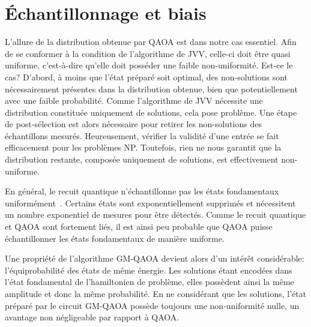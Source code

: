 
\section{Échantillonnage et biais}
\label{sec:echantillonnage-et-biais}

L'allure de la distribution obtenue par QAOA est dans notre cas essentiel. Afin de se conformer à la condition de l'algorithme de JVV, celle-ci doit être quasi uniforme, c'est-à-dire qu'elle doit posséder une faible non-uniformité. Est-ce le cas? D'abord, à moins que l'état préparé soit optimal, des non-solutions sont nécessairement présentes dans la distribution obtenue, bien que potentiellement avec une faible probabilité. Comme l'algorithme de JVV nécessite une distribution constituée uniquement de solutions, cela pose problème. Une étape de post-sélection est alors nécessaire pour retirer les non-solutions des échantillons mesurés. Heureusement, vérifier la validité d'une entrée se fait efficacement pour les problèmes \textsf{NP}. Toutefois, rien ne nous garantit que la distribution restante, composée uniquement de solutions, est effectivement non-uniforme.

En général, le recuit quantique n'échantillonne pas les états fondamentaux uniformément~\cite{matsudaGroundstateStatisticsAnnealing2009, mandraExponentiallyBiasedGroundState2017}. Certains états sont exponentiellement supprimés et nécessitent un nombre exponentiel de mesures pour être détectés. Comme le recuit quantique et QAOA sont fortement liés, il est ainsi peu probable que QAOA puisse échantillonner les états fondamentaux de manière uniforme.

Une propriété de l'algorithme GM-QAOA devient alors d'un intérêt considérable: l'équiprobabilité des états de même énergie. Les solutions étant encodées dans l'état fondamental de l'hamiltonien de problème, elles possèdent ainsi la même amplitude et donc la même probabilité. En ne considérant que les solutions, l'état préparé par le circuit GM-QAOA possède toujours une non-uniformité nulle, un avantage non négligeable par rapport à QAOA.
